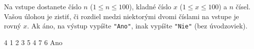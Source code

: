 




Na vstupe dostanete číslo $n$ ($1\leq n \leq 100$), kladné číslo $x$ ($1 \leq x \leq 100$) a $n$ čísel. Vašou úlohou je
zistiť, či rozdiel medzi niektorými dvomi číslami na vstupe je rovný $x$. Ak áno, na výstup vypíšte
\texttt{"Ano"}, inak vypíšte \texttt{"Nie"} (bez úvodzoviek).

 4
1 2 3 5 4 7 6
\vystup
Ano\koniec


